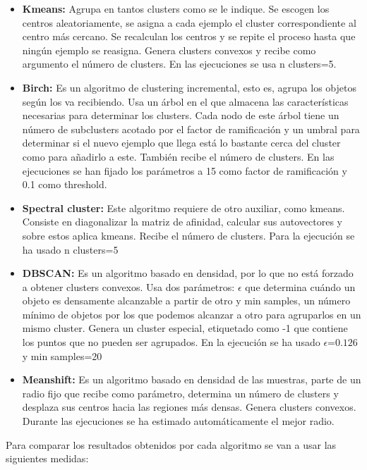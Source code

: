 \begin{itemize}
\item \textbf{Kmeans:} Agrupa en tantos clusters como se le indique. Se escogen los centros aleatoriamente, se asigna a cada ejemplo el cluster correspondiente al centro más cercano. Se recalculan los centros y se repite el proceso hasta que ningún ejemplo se reasigna. Genera clusters convexos y recibe como argumento el número de clusters. En las ejecuciones se usa n clusters=5.
\item \textbf{Birch:} Es un algoritmo de clustering incremental, esto es, agrupa los objetos según los va recibiendo. Usa un árbol en el que almacena las características necesarias para determinar los clusters. Cada nodo de este árbol tiene un número de subclusters acotado por el factor de ramificación y un umbral para determinar si el nuevo ejemplo que llega está lo bastante cerca del cluster como para añadirlo a este. También recibe el número de clusters. En las ejecuciones se han fijado los parámetros a 15 como factor de ramificación y 0.1 como threshold.
\item \textbf{Spectral cluster:} Este algoritmo requiere de otro auxiliar, como kmeans. Consiste en diagonalizar la matriz de afinidad, calcular sus autovectores y sobre estos aplica kmeans. Recibe el número de clusters. Para la ejecución se ha usado n clusters=5
\item \textbf{DBSCAN:} Es un algoritmo basado en densidad, por lo que no está forzado a obtener clusters convexos. Usa dos parámetros: $\epsilon$ que determina cuándo un objeto es densamente alcanzable a partir de otro y min samples, un número mínimo de objetos por los que podemos alcanzar a otro para agruparlos en un mismo cluster. Genera un cluster especial, etiquetado como -1 que contiene los puntos que no pueden ser agrupados. En la ejecución se ha usado $\epsilon$=$0.126$ y min samples=20
\item \textbf{Meanshift:} Es un algoritmo basado en densidad de las muestras, parte de un radio fijo que recibe como parámetro, determina un número de clusters y desplaza sus centros hacia las regiones más densas. Genera clusters convexos. Durante las ejecuciones se ha estimado automáticamente el mejor radio.
\end{itemize}

Para comparar los resultados obtenidos por cada algoritmo se van a usar las siguientes medidas:

